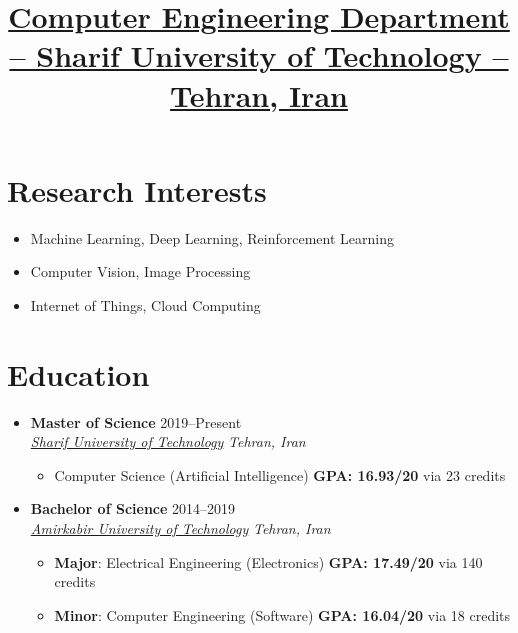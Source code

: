 \documentclass[11pt,a4paper,roman]{moderncv} %
\title{\href{ce.sharif.edu}{\large{\textbf{Computer Engineering Department -- Sharif University of Technology -- Tehran, Iran}}}}
\newcommand*{\authorimg}[1]{%
	\raisebox{-.3\baselineskip}{%
		\texttt{[image: \#1]}%
	}%
}
\begin{document}
	
\makecvtitle
\vspace{-25 pt}

\section{Research Interests}

\begin{itemize}
	\item Machine Learning, Deep Learning, Reinforcement Learning
	\item Computer Vision, Image Processing
	\item Internet of Things, Cloud Computing
\end{itemize}

\section{Education}

\begin{itemize}
	\item \textbf{Master of Science} \hfill 2019--Present \\
	\href{https://en.sharif.edu}{\authorimg{pictures/sut.png} \emph{Sharif University of Technology}} \hfill \emph{Tehran, Iran}
	
	\begin{itemize}
		\item Computer Science (Artificial Intelligence) \hspace{44 pt}  \textbf{GPA: 16.93/20} via 23 credits
	\end{itemize}

	\vspace{8pt}
	
	\item \textbf{Bachelor of Science} \hfill 2014--2019 \\
	\href{https://aut.ac.ir/en}{\authorimg{pictures/aut.png} \emph{Amirkabir University of Technology}} \hfill \emph{Tehran, Iran}
	
	\begin{itemize}
		\item \textbf{Major}: Electrical Engineering (Electronics) \hspace{40 pt}  \textbf{GPA: 17.49/20} via 140 credits
		\item \textbf{Minor}: Computer Engineering (Software) \hspace{45 pt} \textbf{GPA: 16.04/20} via 18 credits
	\end{itemize}
	
\end{itemize}
\end{document}
